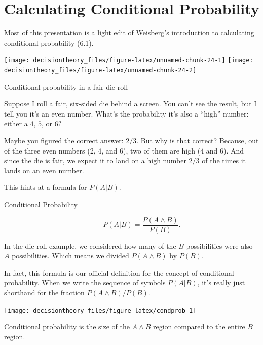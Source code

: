 \documentclass[]{tufte-book}
\begin{document}
\hypertarget{calculating-conditional-probability}{%
\section{Calculating Conditional Probability}\label{calculating-conditional-probability}}

\begin{marginfigure}
Most of this presentation is a light edit of Weisberg's introduction to
calculating conditional probability (6.1).
\end{marginfigure}

\begin{marginfigure}
\texttt{[image: decisiontheory\_files/figure-latex/unnamed-chunk-24-1]} \texttt{[image: decisiontheory\_files/figure-latex/unnamed-chunk-24-2]} \caption[Conditional probability in a fair die roll]{Conditional probability in a fair die roll}\label{fig:unnamed-chunk-24}
\end{marginfigure}

Suppose I roll a fair, six-sided die behind a screen. You can't see the result, but I tell you it's an even number. What's the probability it's also a ``high'' number: either a \(4\), \(5\), or \(6\)?

Maybe you figured the correct answer: \(2/3\). But why is that correct? Because, out of the three even numbers (\(2\), \(4\), and \(6\)), two of them are high (\(4\) and \(6\)). And since the die is fair, we expect it to land on a high number \(2/3\) of the times it lands on an even number.

This hints at a formula for \(P(A | B)\).

\begin{description}
\item[Conditional Probability]
\[ P(A | B) = \frac{P(A \wedge B)}{P(B)}. \]
\end{description}

In the die-roll example, we considered how many of the \(B\) possibilities were also \(A\) possibilities. Which means we divided \(P(A \wedge B)\) by \(P(B)\).

In fact, this formula is our official definition for the concept of conditional probability. When we write the sequence of symbols \(P(A | B)\), it's really just shorthand for the fraction \(P(A \wedge B) / P(B)\).

\begin{marginfigure}
\texttt{[image: decisiontheory\_files/figure-latex/condprob-1]} \caption[Conditional probability is the size of the $A \wedge B$ region compared to the entire $B$ region]{Conditional probability is the size of the $A \wedge B$ region compared to the entire $B$ region.}\label{fig:condprob}
\end{marginfigure}
\end{document}
